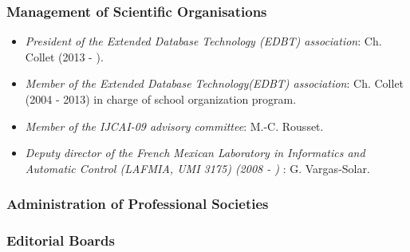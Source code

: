 \subsubsection*{Management of Scientific Organisations}

\begin{itemize}
\setlength{\itemindent}{-0.5cm}
\setlength{\itemsep}{-0.1cm}
\item {\it President of the Extended Database Technology (EDBT) association}: Ch. Collet (2013 - ).

\item {\it Member of the Extended Database Technology(EDBT) association}: Ch. Collet (2004 - 2013) in charge of  school organization program.

\item {\it Member of the IJCAI-09 advisory committee}: M.-C. Rousset.

\item {\it Deputy director of the French Mexican Laboratory in Informatics and Automatic Control (LAFMIA, UMI 3175) (2008 - ) }:  G. Vargas-Solar.


\end{itemize}

 \subsubsection*{Administration of Professional Societies}
\subsubsection*{Editorial Boards}

